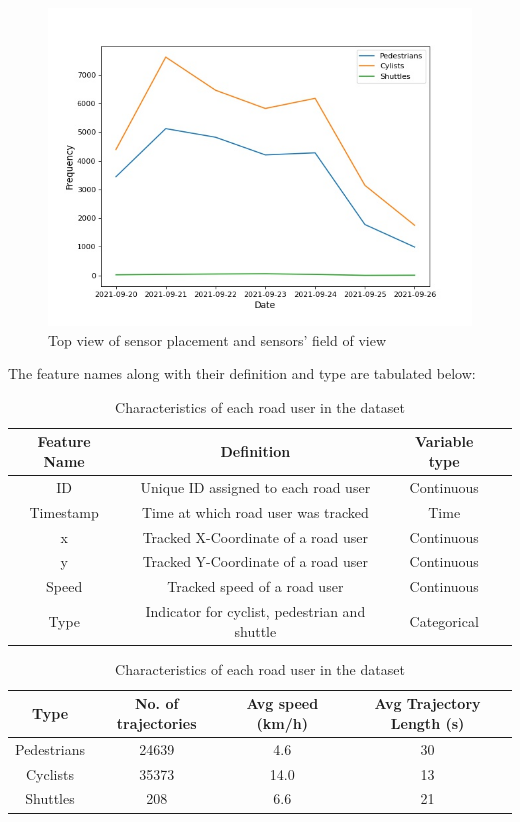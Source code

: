 \documentclass{article}
\begin{document}
\begin{figure}[H]
\centering
\includegraphics[scale=0.3]{data/Data_6.jpg}
\caption{Top view of sensor placement and sensors' field of view}
\end{figure}



The feature names along with their definition and type are tabulated below:
\begin{table}[H]
\begin{center}
\begin{tabular}{ cccc } 
\hline
Feature Name & Definition & Variable type\\
\hline
ID & Unique ID assigned to each road user & Continuous\\ 
Timestamp & Time at which road user was tracked & Time\\ 
x & Tracked X-Coordinate of a road user & Continuous\\
y & Tracked Y-Coordinate of a road user & Continuous \\
Speed & Tracked speed of a road user&Continuous \\
Type & Indicator for cyclist, pedestrian and shuttle & Categorical\\
\hline
\end{tabular}
\caption{\label{tab:features}Characteristics of each road user in the dataset}
\end{center}
\end{table}


\begin{table}[H]
\begin{center}
\begin{tabular}{ cccc } 
\hline
Type & No. of trajectories & Avg speed (km/h) & Avg Trajectory Length (s)\\
\hline
Pedestrians & 24639 & 4.6 &30\\ 
Cyclists & 35373 & 14.0 &13\\ 
Shuttles & 208 & 6.6 &21\\
\hline
\end{tabular}
\caption{\label{tab:road-user}Characteristics of each road user in the dataset}
\end{center}
\end{table}
\end{document}
